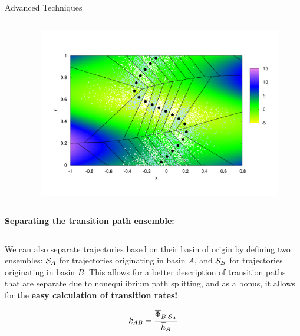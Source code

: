 \documentclass[final]{beamer}
\begin{document}
\begin{columns}[t]
\begin{column}{.33\linewidth}
\begin{block}{Advanced Techniques}
\begin{columns}[t]
\begin{column}{.65\linewidth}
	    \end{column}
	    \begin{column}{.25\linewidth}
	      \begin{figure}
		\includegraphics[width=3 in]{images/whiteandblue.pdf}
	      \end{figure}
	    \end{column}
	  \end{columns}
	  \vspace{30 mm}
	  \textbf{Separating the transition path ensemble:}

	  \begin{columns}[t]
	    \begin{column}{.65\linewidth}

	      We can also separate trajectories based on their basin of origin by defining two ensembles:  ${\cal S}_A$ for trajectories originating in basin $A$, and ${\cal S}_B$ for trajectories originating in basin $B$.
	  This allows for a better description of transition paths that are separate due to nonequilibrium path splitting, and as a bonus, it allows for the \textbf{easy calculation of transition rates!}

	  \begin{equation*}
	    \label{eq:rate}
	    k_{AB} = \frac{\overline{\Phi}_{B \mid {\cal S}_A}}{\overline{h}_A}
	  \end{equation*}


\end{column}
\end{columns}
\end{block}
\end{column}
\end{columns}
\end{document}
